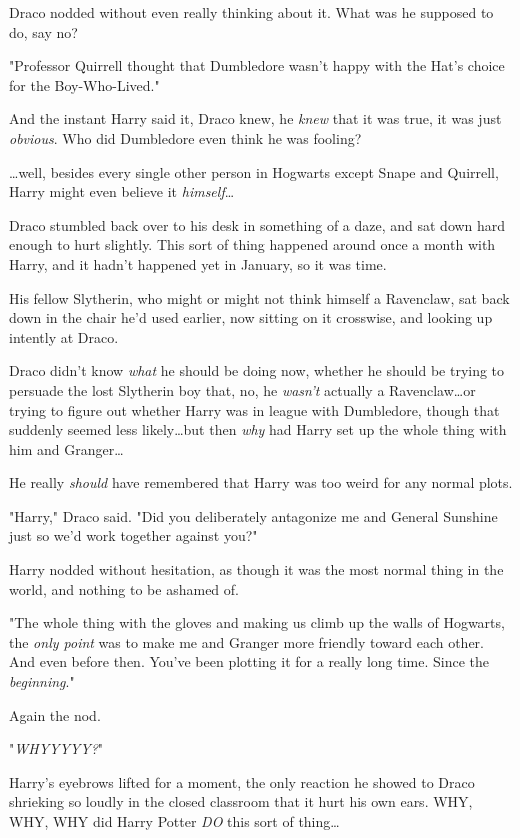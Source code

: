 Draco nodded without even really thinking about it. What was he supposed to do,
say no?

"Professor Quirrell thought that Dumbledore wasn’t happy with the Hat’s choice
for the Boy-Who-Lived."

And the instant Harry said it, Draco knew, he \emph{knew} that it was true, it
was just \emph{obvious}. Who did Dumbledore even think he was fooling?

…well, besides every single other person in Hogwarts except Snape and
Quirrell, Harry might even believe it \emph{himself}…

Draco stumbled back over to his desk in something of a daze, and sat down hard
enough to hurt slightly. This sort of thing happened around once a month with
Harry, and it hadn’t happened yet in January, so it was time.

His fellow Slytherin, who might or might not think himself a Ravenclaw, sat
back down in the chair he’d used earlier, now sitting on it crosswise, and
looking up intently at Draco.

Draco didn’t know \emph{what} he should be doing now, whether he should be
trying to persuade the lost Slytherin boy that, no, he \emph{wasn’t} actually a
Ravenclaw…or trying to figure out whether Harry was in league with
Dumbledore, though that suddenly seemed less likely…but then \emph{why}
had Harry set up the whole thing with him and Granger…

He really \emph{should} have remembered that Harry was too weird for any normal
plots.

"Harry," Draco said. "Did you deliberately antagonize me and General Sunshine
just so we’d work together against you?"

Harry nodded without hesitation, as though it was the most normal thing in the
world, and nothing to be ashamed of.

"The whole thing with the gloves and making us climb up the walls of Hogwarts,
the \emph{only point} was to make me and Granger more friendly toward each
other. And even before then. You’ve been plotting it for a really long time.
Since the \emph{beginning}."

Again the nod.

"\emph{WHYYYYY?}"

Harry’s eyebrows lifted for a moment, the only reaction he showed to Draco
shrieking so loudly in the closed classroom that it hurt his own ears. WHY,
WHY, WHY did Harry Potter \emph{DO} this sort of thing…

